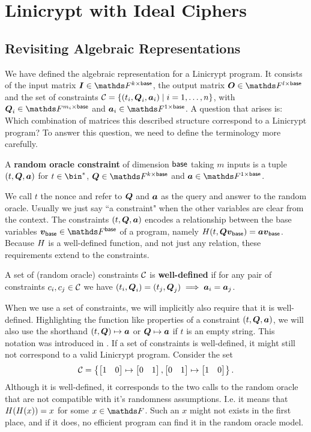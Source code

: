 \chapter{Linicrypt with Ideal Ciphers}

\section{Revisiting Algebraic Representations}
We have defined the algebraic representation for a Linicrypt program.
It consists of the input matrix $\Inp \in \F^{k \times \base}$,
the output matrix $\O \in \F^{l \times \base}$
and the set of constraints $\mathcal{C} = \{ (t_i, \boldsymbol{Q}_i, \boldsymbol a_i) \mid i = 1, \dots, n \}$,
with $\Q_i \in \F^{m_i \times \base}$ and $\va_i \in \F^{1 \times \base}$.
A question that arises is:
Which combination of matrices this described structure correspond to a Linicrypt program?
To answer this question, we need to define the terminology more carefully.

\begin{defn}
A \textbf{random oracle constraint} of dimension $\mathsf{base}$ taking $m$ inputs is a tuple $(t, \boldsymbol Q, \boldsymbol a)$ for
$t \in \bin^*$, $\Q \in \F^{k \times \base}$ and $\va \in \F^{1 \times \base}$.
\end{defn}

We call $t$ the nonce and refer to $\boldsymbol{Q}$ and $\boldsymbol a$ as the query and answer to the random oracle.
Usually we just say ``a constraint" when the other variables are clear from the context.
The constraints $(t, \boldsymbol{Q}, \boldsymbol a)$ encodes a relationship between the base variables $\vbase \in \Base$ of a program,
namely $H(t, \boldsymbol{Q} \boldsymbol v_{\mathsf{base}}) = \boldsymbol a \boldsymbol v_{\mathsf{base}}$.
Because $H$ is a well-defined function,
and not just any relation,
these requirements extend to the constraints.

\begin{defn}
A set of (random oracle) constraints $\mathcal{C}$ is \textbf{well-defined} if for any pair of constraints 
$c_i, c_j \in \mathcal{C}$ we have $(t_i,\boldsymbol{Q}_i) = (t_j, \boldsymbol{Q}_j) \implies \boldsymbol a_i = \boldsymbol a_j$.
\end{defn}

When we use a set of constraints, we will implicitly also require that it is well-defined.
Highlighting the function like properties of a constraint $(t, \boldsymbol{Q}, \boldsymbol a)$,
we will also use the shorthand $(t,\boldsymbol{Q}) \mapsto \boldsymbol a$ or $\boldsymbol{Q} \mapsto \boldsymbol a$ if $t$ is an empty string.
This notation was introduced in \cite{CSF:HolRosRoy22}.
If a set of constraints is well-defined, it might still not correspond to a valid Linicrypt program.
Consider the set
\[
\mathcal{C} = \left\{ \begin{bmatrix}1&0\end{bmatrix} \mapsto \begin{bmatrix}0&1\end{bmatrix}, \begin{bmatrix}0&1\end{bmatrix} \mapsto \begin{bmatrix}1&0\end{bmatrix}\right\}.
\]
Although it is well-defined,
it corresponds to the two calls to the random oracle that are not compatible with it's randomness assumptions.
I.e. it means that $H(H(x)) = x$
for some $x \in \F$.
Such an $x$ might not exists in the first place,
and if it does,
no efficient program can find it in the random oracle model.

